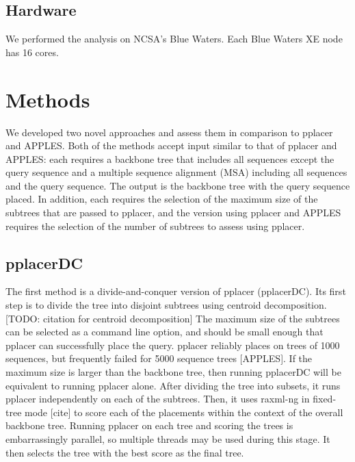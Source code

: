 \documentclass[10pt]{article}
\begin{document}
\subsection{Hardware}

We performed the analysis on NCSA's Blue Waters. Each Blue Waters XE node has 16 cores.


\section{Methods}

We developed two novel approaches and assess them in comparison  to pplacer and APPLES. Both of the methods accept input similar to that of pplacer and APPLES: each requires a backbone tree that includes all sequences except the query sequence and a multiple sequence alignment (MSA) including all sequences and the query sequence. The output is the backbone tree with the query sequence placed. In addition, each requires the selection of the maximum size of the subtrees that are passed to pplacer, and the version using pplacer and APPLES requires the selection of the number of subtrees to assess using pplacer.

\subsection{pplacerDC}

The first method is a divide-and-conquer version of pplacer (pplacerDC). Its first step is to divide the tree into disjoint subtrees using centroid decomposition. [TODO: citation for centroid decomposition] The maximum size of the subtrees can be selected as a command line option, and should be small enough that pplacer can successfully place the query. pplacer reliably places on trees of 1000 sequences, but frequently failed for 5000 sequence trees [APPLES]. If the maximum size is larger than the backbone tree, then running pplacerDC will be equivalent to running pplacer alone. After dividing the tree into subsets, it runs pplacer independently on each of the subtrees. Then, it uses raxml-ng in fixed-tree mode [cite] to score each of the placements within the context of the overall backbone tree. Running pplacer on each tree and scoring the trees is embarrassingly parallel, so multiple threads may be used during this stage. It then selects the tree with the best score as the final tree.
\end{document}

